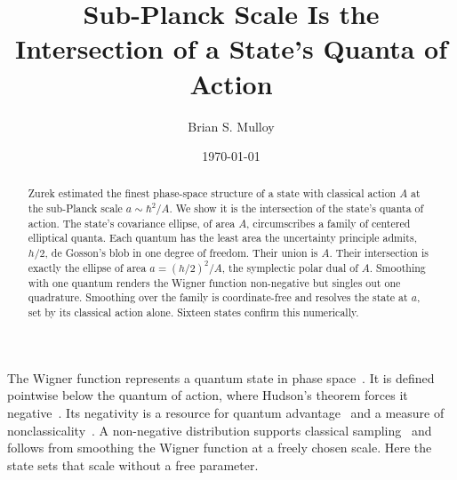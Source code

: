 \documentclass[aps,prl,reprint,amsmath,amssymb,floatfix,nofootinbib]{revtex4-2}
\begin{document}
\title{Sub-Planck Scale Is the Intersection of a State's Quanta of Action}

\begin{abstract}
Zurek estimated the finest phase-space structure of a state with classical action $A$ at the sub-Planck scale $a \sim \hbar^2/A$. We show it is the intersection of the state's quanta of action. The state's covariance ellipse, of area $A$, circumscribes a family of centered elliptical quanta. Each quantum has the least area the uncertainty principle admits, $h/2$, de Gosson's blob in one degree of freedom. Their union is $A$. Their intersection is exactly the ellipse of area $a = (h/2)^2/A$, the symplectic polar dual of $A$. Smoothing with one quantum renders the Wigner function non-negative but singles out one quadrature. Smoothing over the family is coordinate-free and resolves the state at $a$, set by its classical action alone. Sixteen states confirm this numerically.
\end{abstract}

\author{Brian S. Mulloy}

\date{\today}


\maketitle

The Wigner function represents a quantum state in phase space~\cite{wigner1932,hillery1984}. It is defined pointwise below the quantum of action, where Hudson's theorem forces it negative~\cite{hudson1974}. Its negativity is a resource for quantum advantage~\cite{veitch2012,marieisert2012} and a measure of nonclassicality~\cite{kenfack2004}. A non-negative distribution supports classical sampling~\cite{husimi1940,cartwright1976,degosson2005bullsci,dragoman2005phasespace,polkovnikov2010} and follows from smoothing the Wigner function at a freely chosen scale. Here the state sets that scale without a free parameter.
\end{document}

